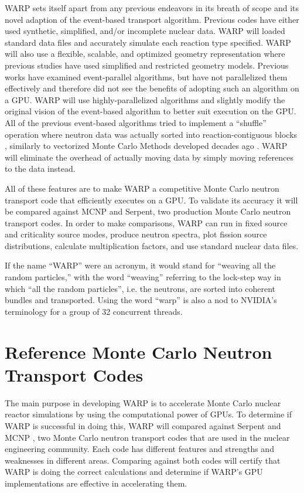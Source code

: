 WARP sets itself apart from any previous endeavors in its breath of scope and its novel adaption of the event-based transport algorithm.  Previous codes have either used synthetic, simplified, and/or incomplete nuclear data.  WARP will loaded standard data files and accurately simulate each reaction type specified.  WARP will also use a flexible, scalable, and optimized geometry representation where previous studies have used simplified and restricted geometry models.  Previous works have examined event-parallel algorithms, but have not parallelized them effectively and therefore did not see the benefits of adopting such an algorithm on a GPU.  WARP will use highly-parallelized algorithms and slightly modify the original vision of the event-based algorithm to better suit execution on the GPU.  All of the previous event-based algorithms tried to implement a ``shuffle'' operation where neutron data was actually sorted into reaction-contiguous blocks \cite{nelson,tianyu_snamc}, similarly to vectorized Monte Carlo Methods developed decades ago \cite{vector,vector_vujic}.  WARP will eliminate the overhead of actually moving data by simply moving references to the data instead.

All of these features are to make WARP a competitive Monte Carlo neutron transport code that efficiently executes on a GPU.  To validate its accuracy it will be compared against MCNP and Serpent, two production Monte Carlo neutron transport codes.  In order to make comparisons,  WARP can run in fixed source and criticality source modes, produce neutron spectra, plot fission source distributions, calculate multiplication factors, and use standard nuclear data files.  

If the name ``WARP'' were an acronym, it would stand for ``weaving all the random particles,'' with the word ``weaving'' referring to the lock-step way in which ``all the random particles'', i.e. the neutrons, are sorted into coherent bundles and transported.  Using the word ``warp'' is also a nod to NVIDIA's terminology for a group of 32 concurrent threads.

\section{Reference Monte Carlo Neutron Transport Codes}

The main purpose in developing WARP is to accelerate Monte Carlo nuclear reactor simulations by using the computational power of GPUs.  To determine if WARP is successful in doing this, WARP will compared against Serpent \cite{jaakko} and MCNP \cite{mcnp}, two Monte Carlo neutron transport codes that are used in the nuclear engineering community.  Each code has different features and strengths and weaknesses in different areas. Comparing against both codes will certify that WARP is doing the correct calculations and determine if WARP's GPU implementations are effective in accelerating them.  

